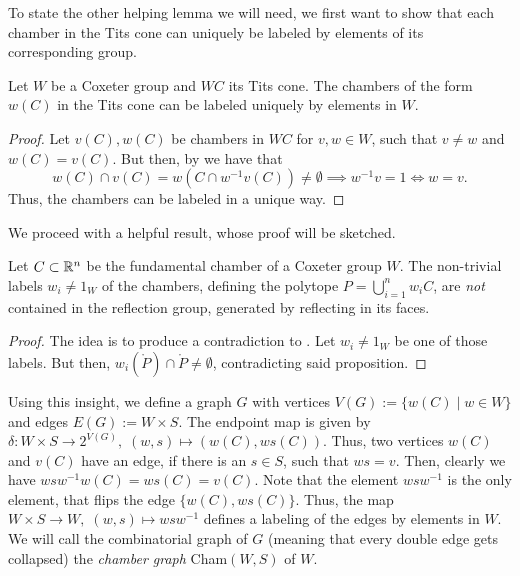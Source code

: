 To state the other helping lemma we will need, we first want to show that each chamber in the Tits cone can uniquely be labeled by elements of its corresponding group.

\begin{lemma}
    Let \(W\) be a Coxeter group and \(WC\) its Tits cone.
    The chambers of the form \(w(C)\) in the Tits cone can be labeled uniquely by elements in \(W\).
\end{lemma}
\begin{proof}
    Let \(v(C), w(C)\) be chambers in \(WC\) for \(v, w \in W\), such that \(v \neq w\) and \(w(C) = v(C)\).\newline
    But then, by  we have that
    \[w(C) \cap v(C) = w(C \cap w^{-1}v(C)) \neq \emptyset \implies w^{-1}v = 1 \iff w = v.\]
    Thus, the chambers can be labeled in a unique way.
\end{proof}

We proceed with a helpful result, whose proof will be sketched.

\begin{lemma}
    Let \(C \subset \mathbb{R}^n\) be the fundamental chamber of a Coxeter group \(W\).
    The non-trivial labels \(w_i \neq 1_W\) of the chambers, defining the polytope \(P = \bigcup_{i=1}^n w_i C\), are \emph{not} contained in the reflection group, generated by reflecting in its faces.
\end{lemma}
\begin{proof}
    The idea is to produce a contradiction to . \newline
    Let \(w_i \neq 1_W\) be one of those labels.
    But then, \(w_i(\mathring{P}) \cap \mathring{P} \neq \emptyset\), contradicting said proposition.
\end{proof}

Using this insight, we define a graph \(G\) with vertices \(V(G) := \{w(C) \;\vert\; w \in W\}\) and edges \(E(G) := W \times S\).
The endpoint map is given by \(\delta : W \times S \to 2^{V(G)},\; (w, s) \mapsto (w(C), ws(C))\).
Thus, two vertices \(w(C)\) and \(v(C)\) have an edge, if there is an \(s \in S\), such that \(ws = v\).
Then, clearly we have \(wsw^{-1}w(C) = ws(C) = v(C)\).
Note that the element \(wsw^{-1}\) is the only element, that flips the edge \(\{w(C), ws(C)\}\).
Thus, the map \(W \times S \to W, \; (w, s) \mapsto wsw^{-1}\) defines a labeling of the edges by elements in \(W\).
We will call the combinatorial graph of \(G\) (meaning that every double edge gets collapsed) the \emph{chamber graph} Cham\((W, S)\) of \(W\).

